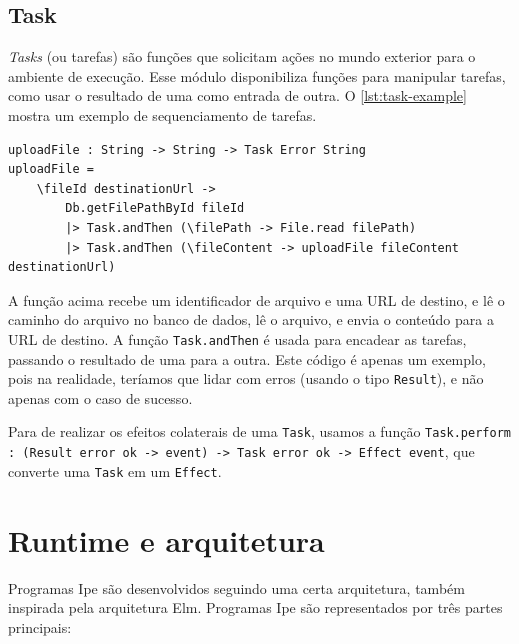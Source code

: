\subsection{Task}

\textit{Tasks} (ou tarefas) são funções que solicitam ações no mundo exterior para
o ambiente de execução. Esse módulo disponibiliza funções para manipular tarefas,
como usar o resultado de uma como entrada de outra. O \autoref{lst:task-example}
mostra um exemplo de sequenciamento de tarefas.

\begin{lstlisting}[label={lst:task-example},caption={Exemplo de sequenciamento de tarefas}]
uploadFile : String -> String -> Task Error String
uploadFile =
    \fileId destinationUrl ->
        Db.getFilePathById fileId
        |> Task.andThen (\filePath -> File.read filePath)
        |> Task.andThen (\fileContent -> uploadFile fileContent destinationUrl)
\end{lstlisting}

A função acima recebe um identificador de arquivo e uma URL de destino, e lê
o caminho do arquivo no banco de dados, lê o arquivo, e envia o conteúdo para
a URL de destino. A função \texttt{Task.andThen} é usada para encadear as tarefas,
passando o resultado de uma para a outra. Este código é apenas um exemplo, pois
na realidade, teríamos que lidar com erros (usando o tipo \texttt{Result}), e
não apenas com o caso de sucesso.

Para de realizar os efeitos colaterais de uma \texttt{Task}, usamos a função
\texttt{Task.perform : (Result error ok -> event) -> Task error ok -> Effect event},
que converte uma \texttt{Task} em um \texttt{Effect}.


\section{Runtime e arquitetura}\label{sec:runtime}

Programas Ipe são desenvolvidos seguindo uma certa arquitetura, também inspirada
pela arquitetura Elm. Programas Ipe são representados por três partes principais:

